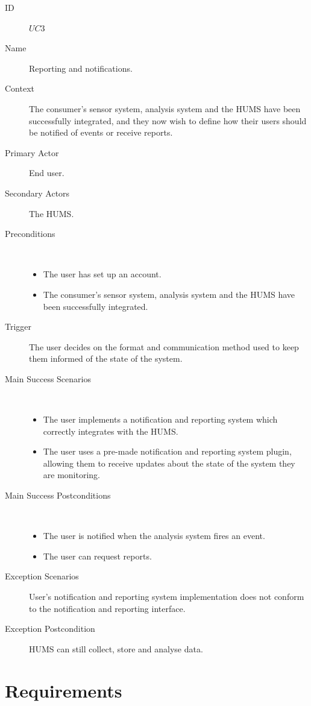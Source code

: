 \documentclass[10pt,a4paper]{article}
\begin{document}
\begin{description}
	\item[ID] $UC3$
	\item[Name] Reporting and notifications.
	\item[Context] The consumer's sensor system, analysis system and the HUMS
	               have been successfully integrated, and they now wish to define
	               how their users should be notified of events or receive reports.
	\item[Primary Actor] End user.
	\item[Secondary Actors] The HUMS.
	\item[Preconditions] ~
			\begin{itemize}
			\item The user has set up an account.
			\item The consumer's sensor system, analysis system and the HUMS have
			      been successfully integrated.
			\end{itemize}
	\item[Trigger] The user decides on the format and communication method used
	               to keep them informed of the state of the system.
	\item[Main Success Scenarios] ~
			\begin{itemize}
				\item The user implements a notification and reporting system which
				      correctly integrates with the HUMS.
				\item The user uses a pre-made notification and reporting system plugin,
				 allowing them to receive updates about the state of the
				      system they are monitoring.
			\end{itemize}
	\item[Main Success Postconditions] ~
			\begin{itemize}
				\item The user is notified when the analysis system fires an event.
				\item The user can request reports.
			\end{itemize}
	\item[Exception Scenarios] User's notification and reporting system
			implementation does not conform to the notification and reporting
			interface.
	\item[Exception Postcondition] HUMS can still collect, store and analyse data.
\end{description}


\section{Requirements}
\end{document}
